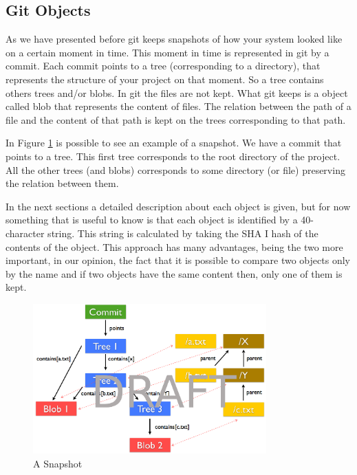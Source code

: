 \subsection{Git Objects}
As we have presented before git keeps snapshots of how your system
looked like on a certain moment in time. This moment in time is
represented in git by a commit. Each commit points to a tree
(corresponding to a directory), that
represents the structure of your project on that moment. So a tree
contains others trees and/or blobs. In git the files are not kept. 
What git keeps is a object called blob that represents the content of files. The
relation between the path of a file and the content of that path 
is kept on the trees corresponding to that path. \par
In Figure \ref{fig:snapshot} is possible to see an example of a snapshot. We
have a commit that points to a tree. This first tree corresponds to
the root directory of the project. All the other trees (and blobs)
corresponds to some directory (or file) preserving the relation
between them. \par
In the next sections a detailed description about each object is
given, but for now something that is useful to know is that each
object is identified by a 40-character string. This string is
calculated by taking the SHA I hash of the contents of the object.
This approach has many advantages, being the two more important, in our
opinion, the
fact that it is possible to compare two objects only by the name and
if two objects have the same content then, only one of them is kept.\par

\begin{figure}[!t]
   \centering
   \includegraphics[width=0.8\textwidth]{images/snapshot.png}
   \caption{A Snapshot}
   \label{fig:snapshot}
\end{figure}

